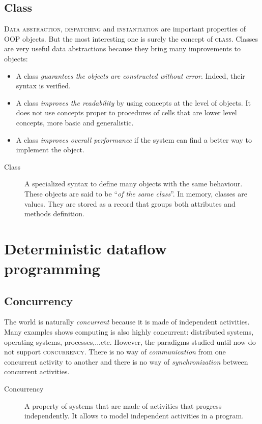 \documentclass[11pt,a4paper,twoside,openright]{report}
\begin{document}
\subsection{Class}
\textsc{Data abstraction}, \textsc{dispatching} and \textsc{instantiation} are 
important properties of OOP objects. But the most interesting one is surely the 
concept of \textsc{class}. Classes are very useful data abstractions because 
they bring many improvements to objects:

\begin{itemize}
	\item A class \textit{guarantees the objects are constructed without 
error}. Indeed, their syntax is verified.
	\item A class \textit{improves the readability} by using concepts at 
the level of objects. It does not use concepts proper to procedures of cells 
that are lower level concepts, more basic and generalistic.
	\item A class \textit{improves overall performance} if the system can 
find a better way to implement the object.
\end{itemize}

\begin{description}
 \item[Class] A specialized syntax to define many objects with the same 
behaviour. These objects are said to be \enquote{\textit{of the same class}}. In 
memory, classes are values. They are stored as a record that groups both 
attributes and methods definition.
\end{description}

\section{Deterministic dataflow programming}

\subsection{Concurrency}
The world is naturally \textit{concurrent} because it is made of independent 
activities. Many examples shows computing is also highly concurrent: 
distributed systems, operating systems, processes,...etc. However, the 
paradigms 
studied until now do not support \textsc{concurrency}. There is no way of 
\textit{communication} from one concurrent activity to another and there is no 
way of \textit{synchronization} between concurrent activities.

\begin{description}
 \item[Concurrency] A property of systems that are made of activities that 
progress independently. It allows to model independent activities in a program.
\end{description}
\end{document}
